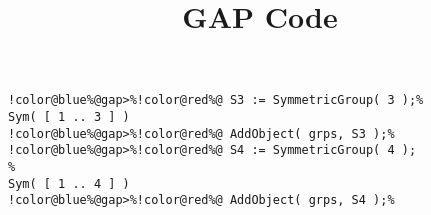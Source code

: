 \documentclass[12pt]{amsart}
\title{GAP Code}
\author{}
\begin{document}
\maketitle

\begin{Verbatim}[commandchars=!@\%,frame=single]
!color@blue%@gap>%!color@red%@ S3 := SymmetricGroup( 3 );%
Sym( [ 1 .. 3 ] ) 
!color@blue%@gap>%!color@red%@ AddObject( grps, S3 );%
!color@blue%@gap>%!color@red%@ S4 := SymmetricGroup( 4 );                                                                                                                                                                            %
Sym( [ 1 .. 4 ] ) 
!color@blue%@gap>%!color@red%@ AddObject( grps, S4 );%
\end{Verbatim}
\end{document}
